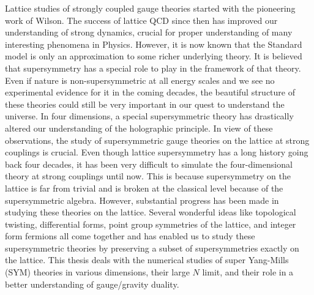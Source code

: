 Lattice studies of strongly coupled gauge theories started with the pioneering work of 
Wilson. The success of lattice QCD since then has improved our understanding of 
strong dynamics, crucial for proper understanding of many interesting phenomena in Physics. 
However, it is now known that the Standard model is only an approximation to some richer 
underlying theory. It is believed that supersymmetry has a special role to play in the framework of that theory. 
Even if nature is non-supersymmetric at all energy scales and we see no experimental evidence 
for it in the coming decades, the beautiful structure of these theories
could still be very important in our quest to understand the universe. 
In four dimensions, a special supersymmetric theory has drastically altered our understanding 
of the holographic principle. In view of these observations, the study of supersymmetric
gauge theories on the lattice at strong couplings is crucial. Even though lattice supersymmetry has a long history 
going back four decades, it has been very difficult to simulate the four-dimensional theory at strong
couplings until now. This is because supersymmetry on the lattice is far from trivial and is broken 
at the classical level because of the supersymmetric algebra. However, substantial progress has 
been made in studying these theories on the lattice. Several wonderful ideas like topological twisting, 
differential forms, point group symmetries of the lattice, and integer form fermions all come together 
and has enabled us to study these supersymmetric theories by preserving a subset of 
supersymmetries exactly on the lattice. This thesis deals with the numerical studies of super Yang-Mills 
(SYM) theories in various dimensions, their large $N$ limit, and their role in a better understanding 
of gauge/gravity duality. 